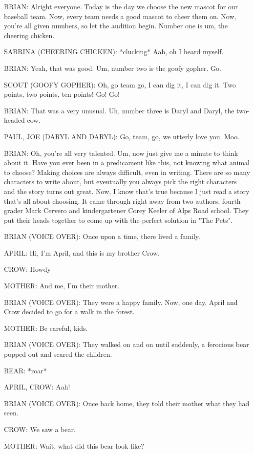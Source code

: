 BRIAN:
Alright everyone.
Today is the day we choose the new mascot for our baseball team.
Now, every team needs a good mascot to cheer them on.
Now, you're all given numbers, so let the audition begin.
Number one is um, the cheering chicken.

SABRINA (CHEERING CHICKEN):
*clucking*
Aah, oh I heard myself.

BRIAN:
Yeah, that was good.
Um, number two is the goofy gopher.
Go.

SCOUT (GOOFY GOPHER):
Oh, go team go, I can dig it, I can dig it.
Two points, two points, ten points!
Go! Go!

BRIAN:
That was a very unusual.
Uh, number three is Daryl and Daryl, the two-headed cow.

PAUL, JOE (DARYL AND DARYL):
Go, team, go, we utterly love you.
Moo.

BRIAN:
Oh, you're all very talented.
Um, now just give me a minute to think about it.
Have you ever been in a predicament like this, not knowing what animal to choose?
Making choices are always difficult, even in writing.
There are so many characters to write about, but eventually you always pick the right characters and the story turns out great.
Now, I know that's true because I just read a story that's all about choosing.
It came through right away from two authors, fourth grader Mark Cervero and kindergartener Corey Keeler of Alps Road school.
They put their heads together to come up with the perfect solution in "The Pets".

BRIAN (VOICE OVER):
Once upon a time, there lived a family.

APRIL:
Hi, I'm April, and this is my brother Crow.

CROW:
Howdy

MOTHER:
And me, I'm their mother.

BRIAN (VOICE OVER):
They were a happy family.
Now, one day, April and Crow decided to go for a walk in the forest.

MOTHER:
Be careful, kids.

BRIAN (VOICE OVER):
They walked on and on until suddenly, a ferocious bear popped out and scared the children.

BEAR:
*roar*

APRIL, CROW:
Aah!

BRIAN (VOICE OVER):
Once back home, they told their mother what they had seen.

CROW:
We saw a bear.

MOTHER:
Wait, what did this bear look like?

